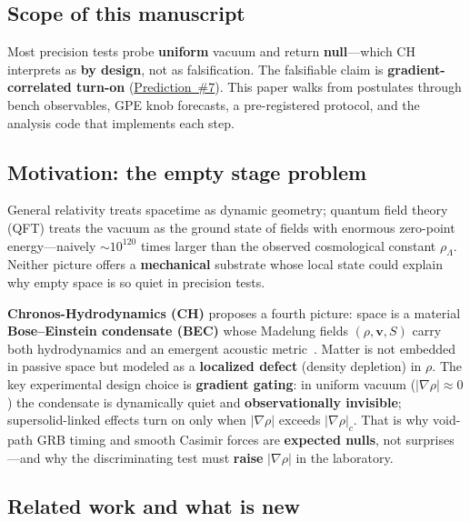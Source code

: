 \documentclass[11pt,a4paper]{article}
\begin{document}
\subsection{Scope of this manuscript}

Most precision tests probe \textbf{uniform} vacuum and return \textbf{null}---which CH interprets as \textbf{by design}, not as falsification.
The falsifiable claim is \textbf{gradient-correlated turn-on} (\hyperref[sec:protocol]{Prediction~\#7}).
This paper walks from postulates through bench observables, GPE knob forecasts, a pre-registered protocol, and the analysis code that implements each step.

\subsection{Motivation: the empty stage problem}

General relativity treats spacetime as dynamic geometry; quantum field theory (QFT) treats the vacuum as the ground state of fields with enormous zero-point energy---naively $\sim 10^{120}$ times larger than the observed cosmological constant $\rho_\Lambda$.
Neither picture offers a \textbf{mechanical} substrate whose local state could explain why empty space is so quiet in precision tests.

\textbf{Chronos-Hydrodynamics (CH)} proposes a fourth picture: space is a material \textbf{Bose--Einstein condensate (BEC)} whose Madelung fields $(\rho, \mathbf{v}, S)$ carry both hydrodynamics and an emergent acoustic metric~\cite{Unruh1981,Visser1995,Volovik2003}.
Matter is not embedded in passive space but modeled as a \textbf{localized defect} (density depletion) in $\rho$.
The key experimental design choice is \textbf{gradient gating}: in uniform vacuum ($|\nabla\rho| \approx 0$) the condensate is dynamically quiet and \textbf{observationally invisible}; supersolid-linked effects turn on only when $|\nabla\rho|$ exceeds $|\nabla\rho|_c$.
That is why void-path GRB timing and smooth Casimir forces are \textbf{expected nulls}, not surprises---and why the discriminating test must \textbf{raise} $|\nabla\rho|$ in the laboratory.

\subsection{Related work and what is new}
\end{document}
